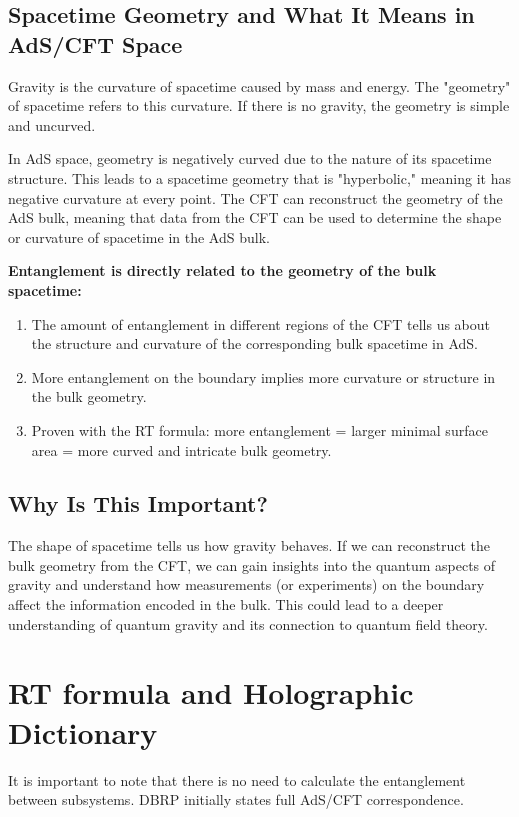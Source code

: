 \documentclass[12pt]{article}
\begin{document}
    \subsection{Spacetime Geometry and What It Means in AdS/CFT Space}
        \hspace{0.5cm} Gravity is the curvature of spacetime caused by mass and energy. The "geometry" of spacetime refers to this curvature. If there is no gravity, the geometry is simple and uncurved.

        In AdS space, geometry is negatively curved due to the nature of its spacetime structure. This leads to a spacetime geometry that is "hyperbolic," meaning it has negative curvature at every point. The CFT can reconstruct the geometry of the AdS bulk, meaning that data from the CFT can be used to determine the shape or curvature of spacetime in the AdS bulk.

        \textbf{Entanglement is directly related to the geometry of the bulk spacetime:}
        \begin{enumerate}
            \item The amount of entanglement in different regions of the CFT tells us about the structure and curvature of the corresponding bulk spacetime in AdS.
            \item More entanglement on the boundary implies more curvature or structure in the bulk geometry.
            \item Proven with the RT formula: more entanglement = larger minimal surface area = more curved and intricate bulk geometry.
        \end{enumerate}

    \subsection{Why Is This Important?}
        \hspace{0.5cm} The shape of spacetime tells us how gravity behaves. If we can reconstruct the bulk geometry from the CFT, we can gain insights into the quantum aspects of gravity and understand how measurements (or experiments) on the boundary affect the information encoded in the bulk. This could lead to a deeper understanding of quantum gravity and its connection to quantum field theory.

\section{RT formula and Holographic Dictionary}
        \hspace{.5cm} It is important to note that there is no need to calculate the entanglement between subsystems. DBRP initially states full AdS/CFT correspondence.
\end{document}
